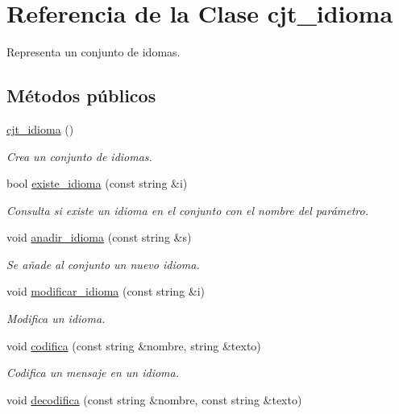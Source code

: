 \hypertarget{classcjt__idioma}{}\section{Referencia de la Clase cjt\+\_\+idioma}
\label{classcjt__idioma}


Representa un conjunto de idomas.  


\subsection*{Métodos públicos}
\begin{DoxyCompactItemize}
\item 
\hyperlink{classcjt__idioma_a79c18a172e61c3276f352a81c479dfb8}{cjt\+\_\+idioma} ()
\begin{DoxyCompactList}\small\item\em Crea un conjunto de idiomas. \end{DoxyCompactList}\item 
bool \hyperlink{classcjt__idioma_a253fbf0732efc679dea434ee7d261ffa}{existe\+\_\+idioma} (const string \&i)
\begin{DoxyCompactList}\small\item\em Consulta si existe un idioma en el conjunto con el nombre del parámetro. \end{DoxyCompactList}\item 
void \hyperlink{classcjt__idioma_aaf8acea2625eb1a72fbeaed23357c4ad}{anadir\+\_\+idioma} (const string \&s)
\begin{DoxyCompactList}\small\item\em Se añade al conjunto un nuevo idioma. \end{DoxyCompactList}\item 
void \hyperlink{classcjt__idioma_ac9cdce411a32c42a9fc7da848f7de4c0}{modificar\+\_\+idioma} (const string \&i)
\begin{DoxyCompactList}\small\item\em Modifica un idioma. \end{DoxyCompactList}\item 
void \hyperlink{classcjt__idioma_a5a92374dcbb5b9a0af7fdfccb59bc423}{codifica} (const string \&nombre, string \&texto)
\begin{DoxyCompactList}\small\item\em Codifica un mensaje en un idioma. \end{DoxyCompactList}\item 
void \hyperlink{classcjt__idioma_a25ee22b5af84a8ce22de2cee8128a08c}{decodifica} (const string \&nombre, const string \&texto)

\end{DoxyCompactItemize}
